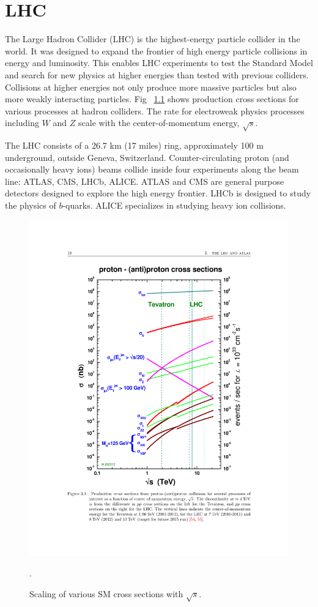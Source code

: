 \label{ch:detector}
\chapter{LHC}
The Large Hadron Collider (LHC) is the highest-energy particle collider in the world. It was designed to expand the frontier of high energy particle collisions in energy and luminosity. This enables LHC experiments to test the Standard Model and search for new physics at higher energies than tested with previous colliders. Collisions at higher energies not only produce more massive particles but also more weakly interacting particles. Fig ~\ref{fig:xs_scaling} shows production cross sections for various processes at hadron colliders. The rate for electroweak physics processes including $W$ and $Z$ scale with the center-of-momentum energy, $\sqrt{s}$.

The LHC consists of a 26.7 km (17 miles) ring, approximately 100 m underground, outside Geneva, Switzerland. Counter-circulating proton (and occasionally heavy ions) beams collide inside four experiments along the beam line: ATLAS, CMS, LHCb, ALICE. ATLAS and CMS are general purpose detectors designed to explore the high energy frontier. LHCb is designed to study the physics of $b$-quarks. ALICE specializes in studying heavy ion collisions. 


\begin{figure}[h!]
  \centering
  \includegraphics[width=\hsize]{figures/Detector/xs_scaling.pdf}
  \caption{Scaling of various SM cross sections with $\sqrt{s}$.}. 
  \label{fig:xs_scaling}
\end{figure}
\FloatBarrier


